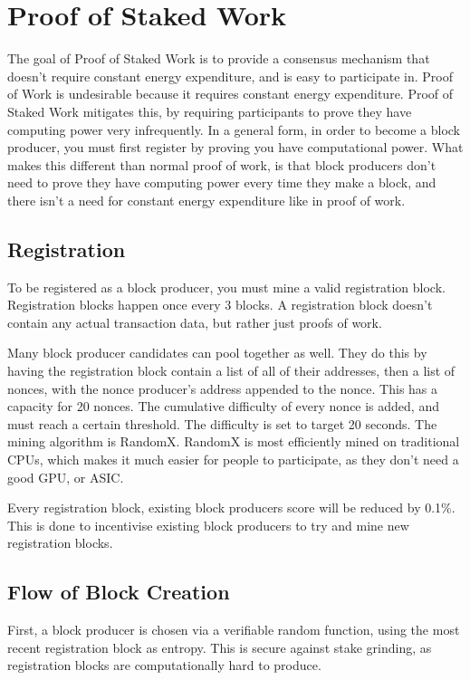 \documentclass[12pt, letterpaper]{article}
\begin{document}
\section{Proof of Staked Work}
The goal of Proof of Staked Work is to provide a consensus mechanism that
doesn't require constant energy expenditure, and is easy to participate in.
Proof of Work is undesirable because it requires constant energy expenditure.
Proof of Staked Work mitigates this, by requiring participants to prove they
have computing power very infrequently. In a general form, in order to become a
block producer, you must first register by proving you have computational power.
What makes this different than normal proof of work, is that block producers
don't need to prove they have computing power every time they make a block, and
there isn't a need for constant energy expenditure like in proof of work.

\subsection{Registration}
To be registered as a block producer, you must mine a valid registration block.
Registration blocks happen once every 3 blocks. A registration block doesn't
contain any actual transaction data, but rather just proofs of work.

Many block producer candidates can pool together as well. They do this by having
the registration block contain a list of all of their addresses, then a list of
nonces, with the nonce producer's address appended to the nonce. This has a
capacity for 20 nonces. The cumulative difficulty of every nonce is added, and
must reach a certain threshold. The difficulty is set to target 20 seconds. The
mining algorithm is RandomX. RandomX is most efficiently mined on traditional
CPUs, which makes it much easier for people to participate, as they don't need a
good GPU, or ASIC.

Every registration block, existing block producers score will be reduced by
0.1\%. This is done to incentivise existing block producers to try and mine new
registration blocks.

\subsection{Flow of Block Creation}
First, a block producer is chosen via a verifiable random function, using the
most recent registration block as entropy. This is secure against stake
grinding, as registration blocks are computationally hard to produce.
\end{document}
